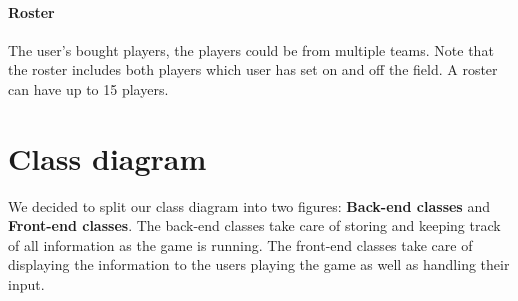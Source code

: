 \documentclass{article}
\begin{document}
\paragraph{Roster} The user's bought players, the players could be from multiple teams. Note that the roster includes both players which user has set on and off the field. A roster can have up to 15 players.

\newpage
\section{Class diagram}
We decided to split our class diagram into two figures: \textbf{Back-end classes} and \textbf{Front-end classes}. The back-end classes take care of storing and keeping track of all information as the game is running. The front-end classes take care of displaying the information to the users playing the game as well as handling their input.
\end{document}
